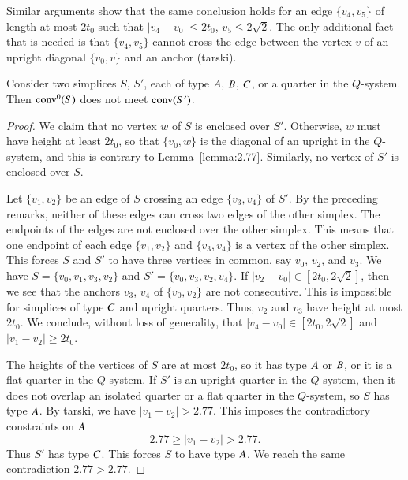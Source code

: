 Similar arguments show that the same conclusion holds for an edge
$\{v_4,v_5\}$ of length at most $2t_0$ such that $|v_4-v_0|\le2t_0$,
$v_5\le2\sqrt{2}$.  The only additional fact that is needed is
that $\{v_4,v_5\}$ cannot cross the edge between the vertex $v$ of
an upright diagonal $\{v_0,v\}$ and an anchor
(tarski).





\begin{lemma}
    Consider two simplices $S$, $S'$, each of  type $A$, $B$, $C$,
or a quarter in the $Q$-system.
    Then 
    ${\operatorname{conv}}^0(S)$ does not meet ${\operatorname{conv}}(S')$.
\end{lemma}

\begin{proof}
We claim that no vertex $w$ of $S$ is enclosed over $S'$.
Otherwise, $w$ must have height at least $2t_0$, so that $\{v_0,w\}$
is the diagonal of an upright in the $Q$-system, and this is
contrary to Lemma~\ref{lemma:2.77}. Similarly, no vertex of $S'$
is enclosed over $S$.

Let $\{v_1,v_2\}$ be an edge of $S$ crossing an edge $\{v_3,v_4\}$ of
$S'$. By the preceding remarks, neither of these edges can cross
two edges of the other simplex. The endpoints of the edges are not
enclosed over the other simplex. This means that one endpoint of
each edge $\{v_1,v_2\}$ and $\{v_3,v_4\}$ is a vertex of the other
simplex.  This forces $S$ and $S'$ to have three vertices in
common, say $v_0$, $v_2$, and $v_3$.  We have $S=\{v_0,v_1,v_3,v_2\}$
and $S'=\{v_0,v_3,v_2,v_4\}$. If
    $|v_2-v_0|\in[2t_0,2\sqrt{2}]$,
then we see that the anchors $v_3$, $v_4$ of $\{v_0,v_2\}$ are not
consecutive.  This is impossible for simplices of type $C$ and
upright quarters.  Thus, $v_2$ and $v_3$ have height at most
$2t_0$.  We conclude, without loss of generality, that
    $|v_4-v_0|\in[2t_0,2\sqrt{2}]$
and $|v_1-v_2|\ge 2t_0$.

The heights of the vertices of $S$ are at most $2t_0$, so it has
type $A$ or $B$, or it is a flat quarter in the $Q$-system. If
$S'$ is an upright quarter in the $Q$-system, then it does not
overlap an isolated quarter or a flat quarter in the $Q$-system,
so $S$ has type $A$. By tarski, we have
$|v_1-v_2|>2.77$.  This imposes the contradictory constraints
on $A$
    $$
    2.77\ge |v_1-v_2|>2.77.
    $$
Thus $S'$ has type $C$.  This forces $S$ to have type $A$.  We
reach the same contradiction  $2.77 > 2.77$.
\end{proof}

